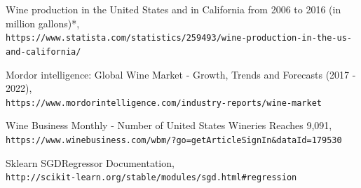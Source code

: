 \documentclass{article}
\begin{document}
\begin{thebibliography}{9}
 
Wine production in the United States and in California from 2006 to 2016 (in million gallons)*,
\\\texttt{https://www.statista.com/statistics/259493/wine-production-in-the-us-and-california/}

Mordor intelligence: Global Wine Market - Growth, Trends and Forecasts (2017 - 2022),
\\\texttt{https://www.mordorintelligence.com/industry-reports/wine-market}

Wine Business Monthly - Number of United States Wineries Reaches 9,091,
\\\texttt{https://www.winebusiness.com/wbm/?go=getArticleSignIn\&dataId=179530}

Sklearn SGDRegressor Documentation,
\\\texttt{http://scikit-learn.org/stable/modules/sgd.html\#regression}

\end{thebibliography}
\end{document}
